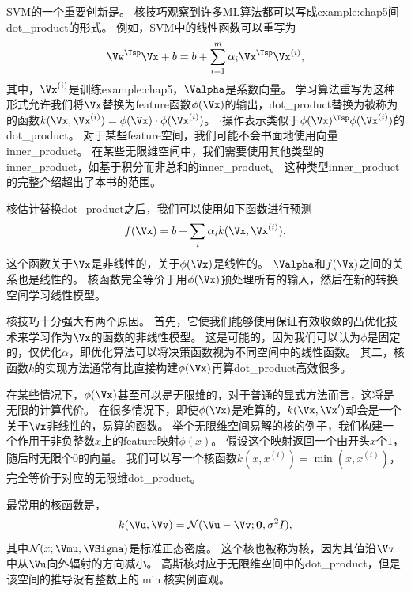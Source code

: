 \gls{SVM}的一个重要创新是。
核技巧观察到许多\gls{ML}算法都可以写成\gls{example:chap5}间\gls{dot_product}的形式。
例如，\gls{SVM}中的线性函数可以重写为
\begin{equation}
    \Vw^\Tsp \Vx + b = b + \sum_{i=1}^m \alpha_i \Vx^\Tsp \Vx^{(i)} ,
\end{equation}
其中，$\Vx^{(i)}$是训练\gls{example:chap5}，$\Valpha$是系数向量。
学习算法重写为这种形式允许我们将$\Vx$替换为\gls{feature}函数$\phi(\Vx)$的输出，\gls{dot_product}替换为被称为的函数$k(\Vx, \Vx^{(i)}) = \phi(\Vx)\cdot \phi(\Vx^{(i)})$。
$\cdot$操作表示类似于$\phi(\Vx)^\Tsp \phi(\Vx^{(i)})$的\gls{dot_product}。
对于某些\gls{feature}空间，我们可能不会书面地使用向量\gls{inner_product}。
在某些无限维空间中，我们需要使用其他类型的\gls{inner_product}，如基于积分而非总和的\gls{inner_product}。
这种类型\gls{inner_product}的完整介绍超出了本书的范围。

核估计替换\gls{dot_product}之后，我们可以使用如下函数进行预测
\begin{equation}
    f(\Vx) = b + \sum_i \alpha_i k(\Vx, \Vx^{(i)}) .
\end{equation}
这个函数关于$\Vx$是非线性的，关于$\phi(\Vx)$是线性的。
$\Valpha$和$f(\Vx)$之间的关系也是线性的。
核函数完全等价于用$\phi(\Vx)$预处理所有的输入，然后在新的转换空间学习线性模型。

核技巧十分强大有两个原因。
首先，它使我们能够使用保证有效收敛的凸优化技术来学习作为$\Vx$的函数的非线性模型。
这是可能的，因为我们可以认为$\phi$是固定的，仅优化$\alpha$，即优化算法可以将决策函数视为不同空间中的线性函数。
其二，核函数$k$的实现方法通常有比直接构建$\phi(\Vx)$再算\gls{dot_product}高效很多。

在某些情况下，$\phi(\Vx)$甚至可以是无限维的，对于普通的显式方法而言，这将是无限的计算代价。
在很多情况下，即使$\phi(\Vx)$是难算的，$k(\Vx,\Vx')$却会是一个关于$\Vx$非线性的，易算的函数。
举个无限维空间易解的核的例子，我们构建一个作用于非负整数$x$上的\gls{feature}映射$\phi(x)$。
假设这个映射返回一个由开头$x$个$1$，随后时无限个$0$的向量。
我们可以写一个核函数$k(x,x^{(i)}) = \min(x, x^{(i)})$，完全等价于对应的无限维\gls{dot_product}。


最常用的核函数是，
\begin{equation}
    k(\Vu, \Vv) = \mathcal{N} (\Vu - \Vv; \mathbf{0}, \sigma^2 I) ,
\end{equation}
其中$\mathcal{N}(x; \Vmu, \VSigma)$是标准正态密度。
这个核也被称为核，因为其值沿$\Vv$中从$\Vu$向外辐射的方向减小。
高斯核对应于无限维空间中的\gls{dot_product}，但是该空间的推导没有整数上的$\min$核实例直观。

